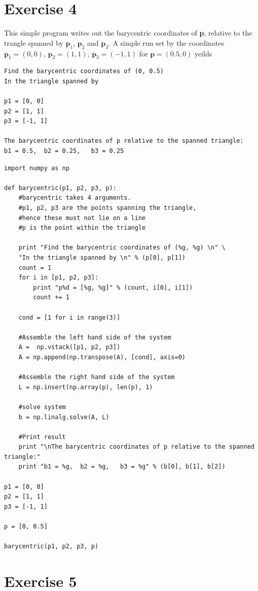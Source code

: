 \documentclass[a4paper,norsk]{article}
\begin{document}
\newpage
\section*{Exercise 4}
This simple program writes out the barycentric coordinates of \textbf{p}, relative to the trangle spanned by $\textbf{p}_1$, $\textbf{p}_2$ and $\textbf{p}_3$. 
A simple run set by the coordinates $\textbf{p}_1 = (0, 0)$, $\textbf{p}_2 = (1, 1)$, $\textbf{p}_3 = (-1, 1)$ for $\textbf{p} = (0.5, 0)$ yeilds

\begin{lstlisting}[style=terminal]
Find the barycentric coordinates of (0, 0.5) 
In the triangle spanned by 

p1 = [0, 0]
p2 = [1, 1]
p3 = [-1, 1]

The barycentric coordinates of p relative to the spanned triangle:
b1 = 0.5,  b2 = 0.25,   b3 = 0.25
\end{lstlisting}

\begin{lstlisting}[style=python]
import numpy as np

def barycentric(p1, p2, p3, p):
    #barycentric takes 4 arguments.
    #p1, p2, p3 are the points spanning the triangle, 
    #hence these must not lie on a line
    #p is the point within the triangle

    print "Find the barycentric coordinates of (%g, %g) \n" \
    "In the triangle spanned by \n" % (p[0], p[1])
    count = 1
    for i in [p1, p2, p3]:
        print "p%d = [%g, %g]" % (count, i[0], i[1])
        count += 1

    cond = [1 for i in range(3)]

    #Assemble the left hand side of the system
    A =  np.vstack([p1, p2, p3])
    A = np.append(np.transpose(A), [cond], axis=0)

    #Assemble the right hand side of the system
    L = np.insert(np.array(p), len(p), 1)

    #solve system
    b = np.linalg.solve(A, L)

    #Print result
    print "\nThe barycentric coordinates of p relative to the spanned triangle:"
    print "b1 = %g,  b2 = %g,   b3 = %g" % (b[0], b[1], b[2])

p1 = [0, 0]
p2 = [1, 1]
p3 = [-1, 1]

p = [0, 0.5]

barycentric(p1, p2, p3, p)
\end{lstlisting}

\newpage
\section{Exercise 5}
\end{document}
